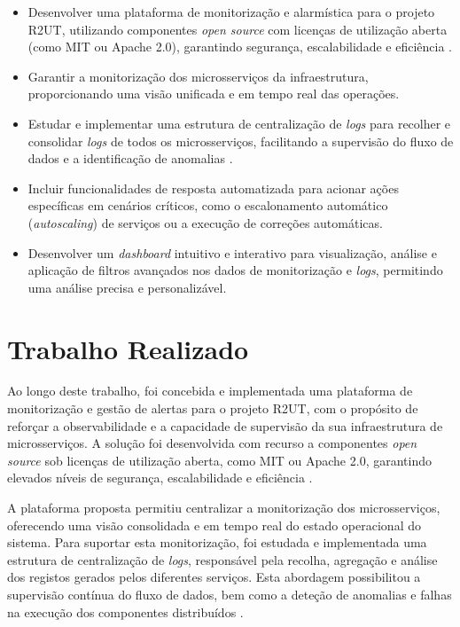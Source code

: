 \begin{itemize}
    \item Desenvolver uma plataforma de monitorização e alarmística para o projeto R2UT, utilizando componentes \textit{open source} com licenças de utilização aberta (como MIT ou Apache 2.0), garantindo segurança, escalabilidade e eficiência \cite{Mayer2017}. 
    \item Garantir a monitorização dos microsserviços da infraestrutura, proporcionando uma visão unificada e em tempo real das operações.
    \item Estudar e implementar uma estrutura de centralização de \textit{logs} para recolher e consolidar \textit{logs} de todos os microsserviços, facilitando a supervisão do fluxo de dados e a identificação de anomalias \cite{Cinque2022}.
    \item Incluir funcionalidades de resposta automatizada para acionar ações específicas em cenários críticos, como o escalonamento automático (\textit{autoscaling}) de serviços ou a execução de correções automáticas. 
    \item Desenvolver um \textit{dashboard} intuitivo e interativo para visualização, análise e aplicação de filtros avançados nos dados de monitorização e \textit{logs}, permitindo uma análise precisa e personalizável. 
\end{itemize}

\break

\section{Trabalho Realizado}

Ao longo deste trabalho, foi concebida e implementada uma plataforma de monitorização e gestão de alertas para o projeto R2UT, com o propósito de reforçar a observabilidade e a capacidade de supervisão da sua infraestrutura de microsserviços. A solução foi desenvolvida com recurso a componentes \textit{open source} sob licenças de utilização aberta, como MIT ou Apache 2.0, garantindo elevados níveis de segurança, escalabilidade e eficiência \cite{Mayer2017}.

A plataforma proposta permitiu centralizar a monitorização dos microsserviços, oferecendo uma visão consolidada e em tempo real do estado operacional do sistema. Para suportar esta monitorização, foi estudada e implementada uma estrutura de centralização de \textit{logs}, responsável pela recolha, agregação e análise dos registos gerados pelos diferentes serviços. Esta abordagem possibilitou a supervisão contínua do fluxo de dados, bem como a deteção de anomalias e falhas na execução dos componentes distribuídos \cite{Cinque2022}.

